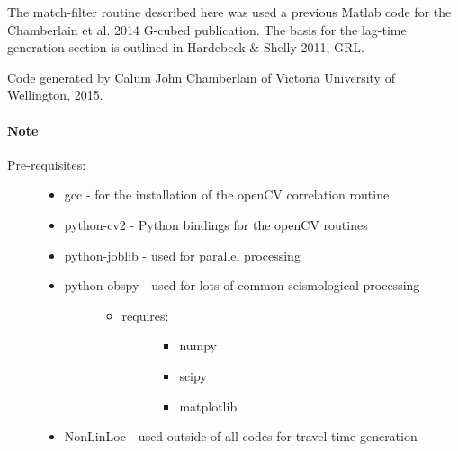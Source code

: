 \documentclass[a4paper,10pt,english]{sphinxmanual}
\begin{document}
The match-filter routine described here was used a previous Matlab code for the
Chamberlain et al. 2014 G-cubed publication.  The basis for the lag-time
generation section is outlined in Hardebeck \& Shelly 2011, GRL.

Code generated by Calum John Chamberlain of Victoria University of Wellington,
2015.
\paragraph{Note}
\begin{description}
\item[{Pre-requisites:}] \leavevmode\begin{itemize}
\item {} 
gcc             - for the installation of the openCV correlation routine

\item {} 
python-cv2      - Python bindings for the openCV routines

\item {} 
python-joblib   - used for parallel processing

\item {} \begin{description}
\item[{python-obspy    - used for lots of common seismological processing}] \leavevmode\begin{itemize}
\item {} \begin{description}
\item[{requires:}] \leavevmode\begin{itemize}
\item {} 
numpy

\item {} 
scipy

\item {} 
matplotlib

\end{itemize}

\end{description}

\end{itemize}

\end{description}

\item {} 
NonLinLoc       - used outside of all codes for travel-time generation

\end{itemize}

\end{description}
\end{document}
